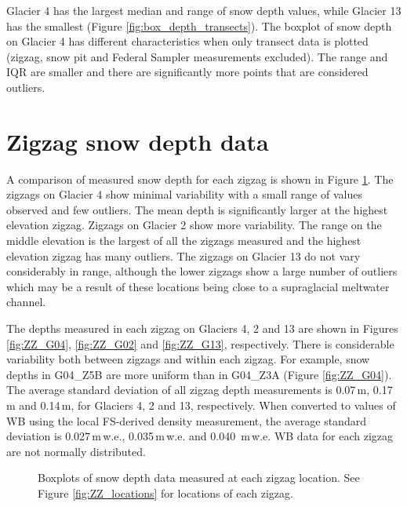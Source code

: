 \documentclass{sfuthesis}
\begin{document}
Glacier 4 has the largest median and range of snow depth values, while Glacier 13 has the smallest (Figure \ref{fig:box_depth_transects}). The boxplot of snow depth on Glacier 4 has different characteristics when only transect data is plotted (zigzag, snow pit and Federal Sampler measurements excluded). The range and IQR are smaller and there are significantly more points that are considered outliers. 

\section{Zigzag snow depth data}

A comparison of measured snow depth for each zigzag is shown in Figure \ref{fig:ZZ_boxplot}. The zigzags on Glacier 4 show minimal variability with a small range of values observed and few outliers. The mean depth is significantly larger at the highest elevation zigzag. Zigzags on Glacier 2 show more variability. The range on the middle elevation is the largest of all the zigzags measured and the highest elevation zigzag has many outliers. The zigzags on Glacier 13 do not vary considerably in range, although the lower zigzags show a large number of outliers which may be a result of these locations being close to a supraglacial meltwater channel. 

The depths measured in each zigzag on Glaciers 4, 2 and 13 are shown in Figures \ref{fig:ZZ_G04}, \ref{fig:ZZ_G02} and \ref{fig:ZZ_G13}, respectively. There is considerable variability both between zigzags and within each zigzag. For example, snow depths in G04\_Z5B are more uniform than in G04\_Z3A (Figure \ref{fig:ZZ_G04}). The average standard deviation of all zigzag depth measurements is 0.07\,m, 0.17\,m and 0.14\,m, for Glaciers 4, 2 and 13, respectively. When converted to values of WB using the local FS-derived density measurement, the average standard deviation is 0.027\,m\,w.e., 0.035\,m\,w.e. and 0.040 \,m\,w.e. WB data for each zigzag are not normally distributed.

\begin{figure}
	\centering
	\caption{Boxplots of snow depth data measured at each zigzag location. See Figure \ref{fig:ZZ_locations} for locations of each zigzag.}
	\label{fig:ZZ_boxplot}
\end{figure}
\end{document}
